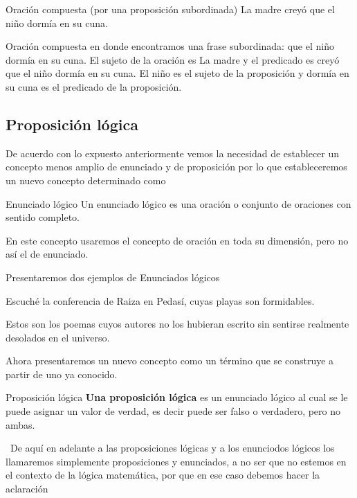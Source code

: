 \begin{ejem}{Oración compuesta (por una proposición subordinada)}
La madre creyó que el niño dormía en su cuna. \end{ejem}

Oración compuesta en donde encontramos una frase subordinada: que
el niño dormía en su cuna. El sujeto de la oración es La madre y el
predicado es creyó que el niño dormía en su cuna. El niño es el sujeto
de la proposición y dormía en su cuna es el predicado de la proposición.


\subsection{Proposición lógica}

De acuerdo con lo expuesto anteriormente vemos la necesidad de establecer
un concepto menos amplio de enunciado y de proposición por lo que
estableceremos un nuevo concepto determinado como

\begin{tndefinido}{Enunciado lógico}\textsf{ Un enunciado lógico}
es una oración o conjunto de oraciones con sentido completo.\end{tndefinido} 

En este concepto usaremos el concepto de oración en toda su dimensión,
pero no así el de enunciado.

Presentaremos dos ejemplos de Enunciados lógicos

\begin{lista}

\item Escuché la conferencia de Raiza en Pedasí, \textsf{cuyas playas
son formidables}.

\item Estos son los poemas \textsf{cuyos autores no los hubieran
escrito sin sentirse realmente desolados en el universo.}

\end{lista}

Ahora presentaremos un nuevo concepto como un término que se construye
a partir de uno ya conocido.

\begin{definicionn}{Proposición lógica}\textbf{ Una proposición
lógica} es un enunciado lógico al cual se le puede asignar un valor
de verdad, es decir puede ser falso o verdadero, pero no ambas.\end{definicionn}

\nota\ De aquí en adelante a las proposiciones lógicas y a los enunciodos
lógicos los llamaremos simplemente proposiciones y enunciados, a no
ser que no estemos en el contexto de la lógica matemática, por que
en ese caso debemos hacer la aclaración 

